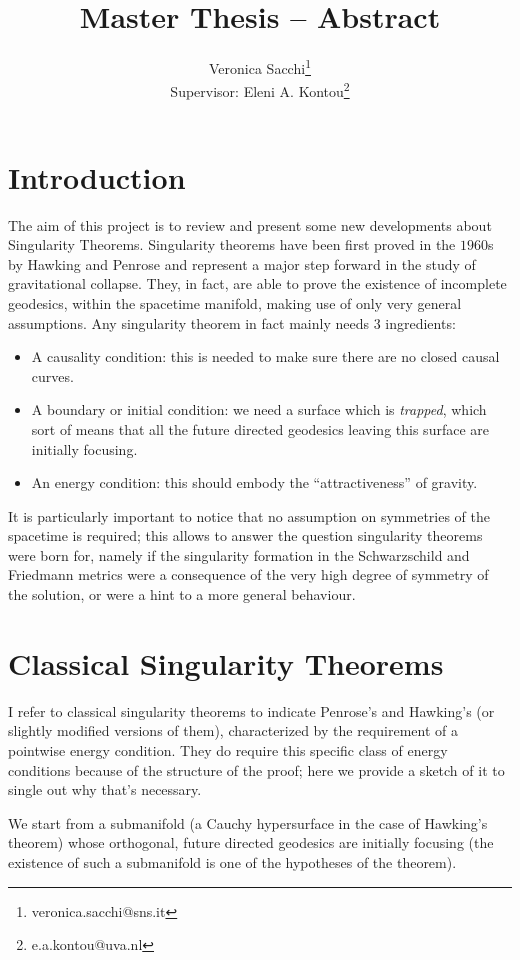 \documentclass[12pt, a4paper]{article}
\title{Master Thesis -- Abstract}
\author{Veronica Sacchi\thanks{veronica.sacchi@sns.it}\\
Supervisor: Eleni A. Kontou\thanks{e.a.kontou@uva.nl}}
\begin{document}
\maketitle

\section{Introduction}
The aim of this project is to review and present some new developments about Singularity Theorems.
Singularity theorems have been first proved in the \(1960\)s by Hawking \cite{hawking1966occurrence} and Penrose \cite{penrose1965gravitational} and represent a major step forward in the study of gravitational collapse.
They, in fact, are able to prove  the existence of incomplete geodesics, within the spacetime manifold, making use of only very general assumptions.
Any singularity theorem in fact mainly needs \(3\) ingredients:
\begin{itemize}
	\item A causality condition: this is needed to make sure there are no closed causal curves.
	\item A boundary or initial condition: we need a surface which is \emph{trapped}, which sort of means that all the future directed geodesics leaving this surface are initially focusing.
	\item An energy condition: this should embody the ``attractiveness'' of gravity.
\end{itemize}

It is particularly important to notice that no assumption on symmetries of the spacetime is required; this allows to answer the question singularity theorems were born for, namely if the singularity formation in the Schwarzschild and Friedmann metrics were a consequence of the very high degree of symmetry of the solution, or were a hint to a more general behaviour.

\section{Classical Singularity Theorems}
I refer to classical singularity theorems to indicate Penrose's and Hawking's (or slightly modified versions of them), characterized by the requirement of a pointwise energy condition.
They do require this specific class of energy conditions because of the structure of the proof; here we provide a sketch of it to single out why that's necessary.

We start from a submanifold (a Cauchy hypersurface in the case of Hawking's theorem) whose orthogonal, future directed geodesics are initially focusing (the existence of such a submanifold is one of the hypotheses of the theorem).
\end{document}
